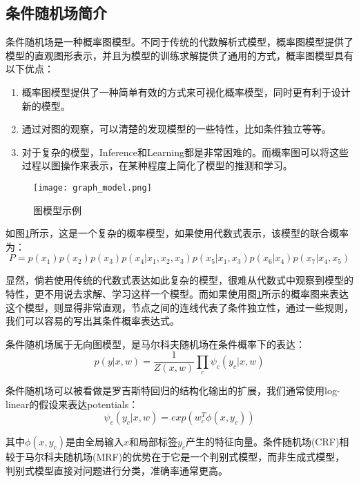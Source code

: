 \subsection{条件随机场简介}
条件随机场是一种概率图模型。不同于传统的代数解析式模型，概率图模型提供了模型的直观图形表示，并且为模型的训练求解提供了通用的方式，概率图模型具有以下优点\cite{bishop2006pattern}：
\begin{enumerate}
\item 概率图模型提供了一种简单有效的方式来可视化概率模型，同时更有利于设计新的模型。
\item 通过对图的观察，可以清楚的发现模型的一些特性，比如条件独立等等。
\item 对于复杂的模型，Inference和Learning都是非常困难的。而概率图可以将这些过程以图操作来表示，在某种程度上简化了模型的推测和学习。
\end{enumerate}

\begin{figure}
\centering
\texttt{[image: graph\_model.png]}
\caption{图模型示例}\label{fig:graph_model}
\end{figure}

如图\ref{fig:graph_model}所示，这是一个复杂的概率模型，如果使用代数式表示，该模型的联合概率为：
\begin{equation}
P = p(x_1)p(x_2)p(x_3)p(x_4|x_1,x_2,x_3)p(x_5|x_1,x_3)p(x_6|x_4)p(x_7|x_4,x_5)
\end{equation}

显然，倘若使用传统的代数式表达如此复杂的模型，很难从代数式中观察到模型的特性，更不用说去求解、学习这样一个模型。而如果使用图\ref{fig:graph_model}所示的概率图来表达这个模型，则显得非常直观，节点之间的连线代表了条件独立性，通过一些规则，我们可以容易的写出其条件概率表达式。

条件随机场属于无向图模型，是马尔科夫随机场在条件概率下的表达：
\begin{equation}
p(y|x,w)=\frac{1}{Z(x,w)}\prod_c \psi_c(y_c|x, w)
\end{equation}

条件随机场可以被看做是罗吉斯特回归的结构化输出的扩展\cite{murphy2012machine}，我们通常使用log-linear的假设来表达potentials：
\begin{equation}
\psi_c(y_c|x,w)=exp(w_c^T \phi(x,y_c))
\end{equation}

其中$\phi(x,y_c)$是由全局输入$x$和局部标签$y_c$产生的特征向量。条件随机场(CRF)相较于马尔科夫随机场(MRF)的优势在于它是一个判别式模型，而非生成式模型，判别式模型直接对问题进行分类，准确率通常更高。

